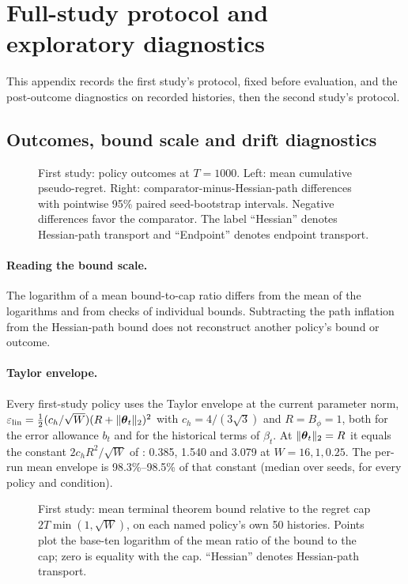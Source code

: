 \section{Full-study protocol and exploratory diagnostics}
\label{app:transport-followup}

This appendix records the first study's protocol, fixed before evaluation, and
the post-outcome diagnostics on recorded histories, then the second study's
protocol.

\subsection*{Outcomes, bound scale and drift diagnostics}

\begin{figure}[t]
  \centering
  
 \caption{First study: policy outcomes at $T=1000$. Left: mean cumulative pseudo-regret. Right: comparator-minus-Hessian-path differences with pointwise 95\% paired seed-bootstrap intervals. Negative differences favor the comparator. The label ``Hessian'' denotes Hessian-path transport and ``Endpoint'' denotes endpoint transport.}
 \label{fig:transport-followup-outcomes}
\end{figure}

\paragraph{Reading the bound scale.}
The logarithm of a mean bound-to-cap ratio differs from the mean of the
logarithms and from checks of individual bounds. Subtracting the path
inflation from the Hessian-path bound does not reconstruct another policy's
bound or outcome.

\paragraph{Taylor envelope.}
Every first-study policy uses the Taylor envelope at the current parameter
norm, $\varepsilon_{\mathrm{lin}}=\tfrac12(c_h/\sqrt W)(R+\|\boldsymbol{\theta}_t\|_2)^2$ with
$c_h=4/(3\sqrt3)$ and $R=B_\phi=1$, both for the error allowance $b_t$ and for
the historical terms of $\beta_t$. At $\|\boldsymbol{\theta}_t\|_2=R$ it equals the
constant $2c_hR^2/\sqrt W$ of : 0.385, 1.540
and 3.079 at $W=16,1,0.25$. The per-run mean envelope is 98.3\%--98.5\% of
that constant (median over seeds, for every policy and condition).

\begin{figure}[t]
 \centering
 
 \caption{First study: mean terminal theorem bound relative to the regret cap $2T\min(1,\sqrt W)$, on each named policy's own 50 histories. Points plot the base-ten logarithm of the mean ratio of the bound to the cap; zero is equality with the cap. ``Hessian'' denotes Hessian-path transport.}
 \label{fig:transport-followup-bound-scale}
\end{figure}

